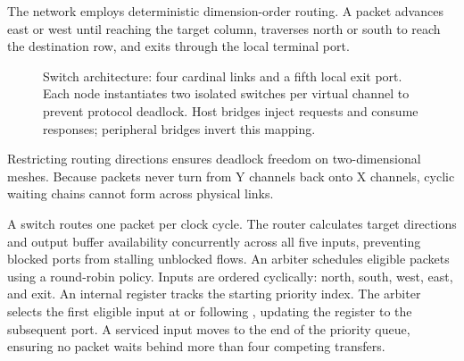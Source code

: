 \documentclass[journal,9pt]{IEEEtran}
\newcommand{\nocpart}[4]{%
}
\begin{document}
The network employs deterministic dimension-order routing. A packet advances
east or west until reaching the target column, traverses north or south to
reach the destination row, and exits through the local terminal port.

\begin{figure}[htbp]
\centering
{}
\caption{Switch architecture: four cardinal links and a fifth local exit
port. Each node instantiates two isolated switches per virtual channel to
prevent protocol deadlock. Host bridges inject requests and consume responses;
peripheral bridges invert this mapping.}
\label{fig:n-node}
\end{figure}

\nocpart{switch.rs}{route}{Dimension-order routing implementation.}{lst:n-route}

Restricting routing directions ensures deadlock freedom on two-dimensional
meshes. Because packets never turn from Y channels back onto X channels,
cyclic waiting chains cannot form across physical links.

A switch routes one packet per clock cycle. The router calculates target
directions and output buffer availability concurrently across all five
inputs, preventing blocked ports from stalling unblocked flows. An arbiter
schedules eligible packets using a round-robin policy. Inputs are ordered
cyclically: north, south, west, east, and exit. An internal 
register tracks the starting priority index. The arbiter selects the first
eligible input at or following , updating the register to the
subsequent port. A serviced input moves to the end of the priority queue,
ensuring no packet waits behind more than four competing transfers.
\end{document}
